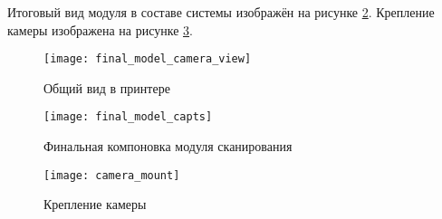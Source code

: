         Итоговый вид модуля в составе системы изображён на рисунке \ref{pic:final_model}. Крепление камеры изображена на рисунке \ref{pic:camera_mount}.

        \begin{figure}[H]
            \centering
            \texttt{[image: final\_model\_camera\_view]}
            \caption{Общий вид в принтере}
            \label{pic:final_model_camera_view}
        \end{figure}
        
        \begin{figure}[H]
            \centering
            \texttt{[image: final\_model\_capts]}
            \caption{Финальная компоновка модуля сканирования}
            \label{pic:final_model}
        \end{figure}
    
        \begin{figure}[H]
            \centering
            \texttt{[image: camera\_mount]}
            \caption{Крепление камеры}
            \label{pic:camera_mount}
        \end{figure}